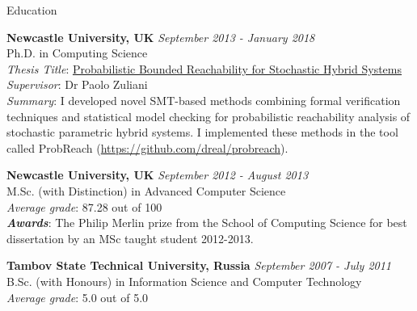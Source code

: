 \documentclass{resume} %
\begin{document}
\vspace{1ex}


\begin{rSection}{Education}


{\bf Newcastle University, UK} \hfill {\em September 2013 - January 2018} \\ 
Ph.D. in Computing Science  \\
{\em Thesis Title}: \href{http://hdl.handle.net/10443/4046}{Probabilistic Bounded Reachability for Stochastic Hybrid Systems} \\ 
{\em Supervisor}: Dr Paolo Zuliani \\
{\em Summary}: I developed novel SMT-based methods combining formal verification techniques
and statistical model checking for probabilistic reachability analysis
of stochastic parametric hybrid systems. 
I implemented these methods in the tool 
called ProbReach (\url{https://github.com/dreal/probreach}).

\smallskip 

{\bf Newcastle University, UK} \hfill {\em September 2012 - August 2013} \\ 
M.Sc. (with Distinction) in Advanced Computer Science \\
{\em Average grade}: 87.28 out of 100 \\
{\bf {\em Awards}}: The Philip Merlin prize from the School of Computing Science 
for best dissertation by an MSc taught student 2012-2013.
\smallskip 

{\bf Tambov State Technical University, Russia} \hfill {\em September 2007 - July 2011} \\ 
B.Sc. (with Honours) in Information Science and Computer Technology \\
{\em Average grade}: 5.0 out of 5.0

\end{rSection}




\end{document}
